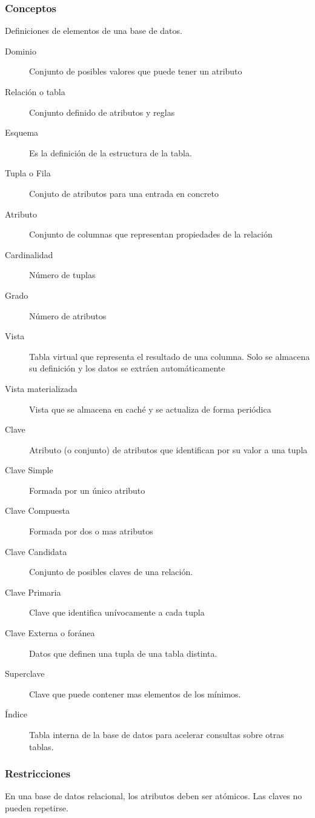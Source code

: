     \subsubsection{Conceptos}
        Definiciones de elementos de una base de datos.
        \begin{description}
            \item[Dominio] Conjunto de posibles valores que puede tener un atributo
            \item[Relación o tabla] Conjunto definido de atributos y reglas
            \item[Esquema] Es la definición de la estructura de la tabla.
            \item[Tupla o Fila] Conjuto de atributos para una entrada en concreto
            \item[Atributo] Conjunto de columnas que representan propiedades de la relación
            \item[Cardinalidad] Número de tuplas
            \item[Grado] Número de atributos
            \item[Vista] Tabla virtual que representa el resultado de una columna. Solo se almacena su definición y los datos se extráen automáticamente
            \item[Vista materializada] Vista que se almacena en caché y se actualiza de forma periódica
            \item[Clave] Atributo (o conjunto) de atributos que identifican por su valor a una tupla
            \item[Clave Simple] Formada por un único atributo
            \item[Clave Compuesta] Formada por dos o mas atributos
            \item[Clave Candidata] Conjunto de posibles claves de una relación.
            \item[Clave Primaria] Clave que identifica unívocamente a cada tupla
            \item[Clave Externa o foránea] Datos que definen una tupla de una tabla distinta.
            \item[Superclave] Clave que puede contener mas elementos de los mínimos.
            \item[Índice] Tabla interna de la base de datos para acelerar consultas sobre otras tablas.
        \end{description}

    \subsubsection{Restricciones}
        En una base de datos relacional, los atributos deben ser atómicos. Las claves no pueden repetirse.

